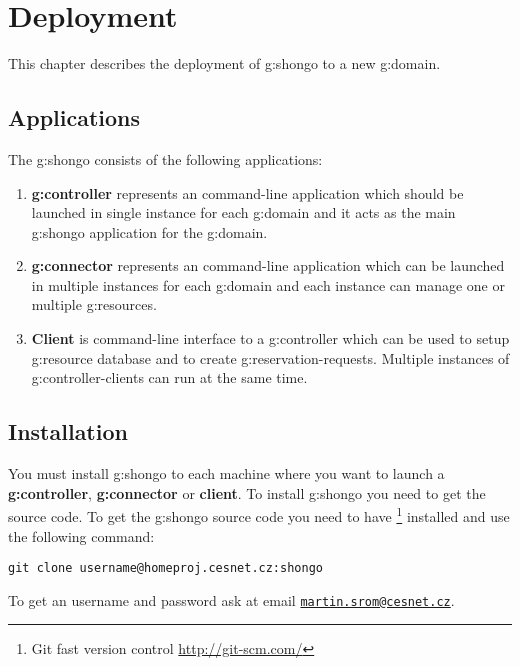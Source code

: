 \chapter{Deployment}

This chapter describes the deployment of \gls{g:shongo} to a new \gls{g:domain}.

\section{Applications}

The \gls{g:shongo} consists of the following applications:
\begin{enumerate}
\item \textbf{\Gls{g:controller}} represents an command-line application which should be launched in single instance for each \gls{g:domain} and it acts as the main \gls{g:shongo} application for the \gls{g:domain}.
\item \textbf{\Gls{g:connector}} represents an command-line application which can be launched in multiple instances for each \gls{g:domain} and each instance can manage one or multiple \glspl{g:resource}.
\item \textbf{Client} is command-line interface to a \gls{g:controller} which can be used to setup \gls{g:resource} database and to create \glspl{g:reservation-request}. Multiple instances of \glspl{g:controller-client} can run at the same time.
\end{enumerate}

\section{Installation}

You must install \gls{g:shongo} to each machine where you want to launch a \textbf{\gls{g:controller}}, \textbf{\gls{g:connector}} or \textbf{client}. To install \gls{g:shongo} you need to get the source code. To get the \gls{g:shongo} source code you need to have \footnote{Git fast version control \url{http://git-scm.com/}} installed and use the following command:
\begin{verbatim}
git clone username@homeproj.cesnet.cz:shongo
\end{verbatim}
To get an username and password ask at email \href{mailto:martin.srom@cesnet.cz}{\texttt{martin.srom@cesnet.cz}}. 


